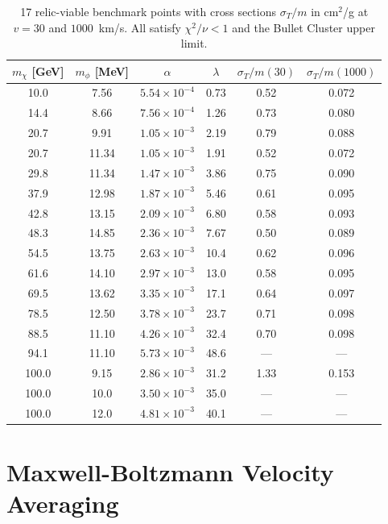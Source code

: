 \documentclass[12pt,a4paper]{article}
\newcommand{\sigmaT}{\sigma_T}
\begin{document}
\begin{table}[h!]
\centering
\caption{17 relic-viable benchmark points with cross sections $\sigmaT/m$ in
cm$^2$/g at $v = 30$ and $1000$~km/s. All satisfy $\chi^2/\nu < 1$ and the
Bullet Cluster upper limit.}
\label{tab:full_bp}
\begin{tabular}{cccccc}
\toprule
$m_\chi$ [GeV] & $m_\phi$ [MeV] & $\alpha$ & $\lambda$ &
  $\sigmaT/m(30)$ & $\sigmaT/m(1000)$ \\
\midrule
10.0  & 7.56  & $5.54\times10^{-4}$ & 0.73 & 0.52 & 0.072 \\
14.4  & 8.66  & $7.56\times10^{-4}$ & 1.26 & 0.73 & 0.080 \\
20.7  & 9.91  & $1.05\times10^{-3}$ & 2.19 & 0.79 & 0.088 \\
20.7  & 11.34 & $1.05\times10^{-3}$ & 1.91 & 0.52 & 0.072 \\
29.8  & 11.34 & $1.47\times10^{-3}$ & 3.86 & 0.75 & 0.090 \\
37.9  & 12.98 & $1.87\times10^{-3}$ & 5.46 & 0.61 & 0.095 \\
42.8  & 13.15 & $2.09\times10^{-3}$ & 6.80 & 0.58 & 0.093 \\
48.3  & 14.85 & $2.36\times10^{-3}$ & 7.67 & 0.50 & 0.089 \\
54.5  & 13.75 & $2.63\times10^{-3}$ & 10.4 & 0.62 & 0.096 \\
61.6  & 14.10 & $2.97\times10^{-3}$ & 13.0 & 0.58 & 0.095 \\
69.5  & 13.62 & $3.35\times10^{-3}$ & 17.1 & 0.64 & 0.097 \\
78.5  & 12.50 & $3.78\times10^{-3}$ & 23.7 & 0.71 & 0.098 \\
88.5  & 11.10 & $4.26\times10^{-3}$ & 32.4 & 0.70 & 0.098 \\
94.1  & 11.10 & $5.73\times10^{-3}$ & 48.6 & — & — \\
100.0 & 9.15  & $2.86\times10^{-3}$ & 31.2 & 1.33 & 0.153 \\
100.0 & 10.0  & $3.50\times10^{-3}$ & 35.0 & — & — \\
100.0 & 12.0  & $4.81\times10^{-3}$ & 40.1 & — & — \\
\bottomrule
\end{tabular}
\end{table}

\section{Maxwell-Boltzmann Velocity Averaging}
\label{app:mb_average}
\end{document}
